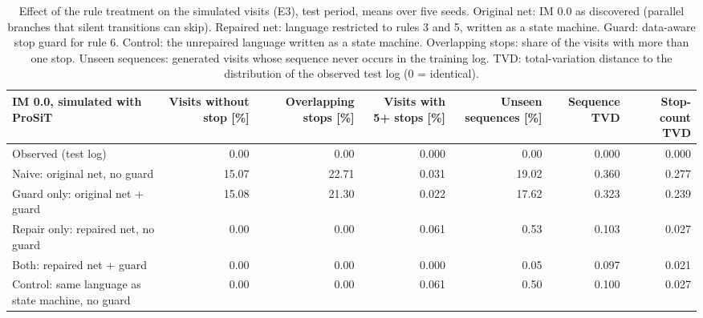 \begin{table}[htbp]
\centering
\footnotesize
\setlength{\tabcolsep}{3pt}
\begin{tabularx}{\textwidth}{Yrrrrrr}
\toprule
\textbf{IM 0.0, simulated with ProSiT} & \textbf{Visits without stop [\%]} & \textbf{Overlapping stops [\%]} & \textbf{Visits with 5+ stops [\%]} & \textbf{Unseen sequences [\%]} & \textbf{Sequence TVD} & \textbf{Stop-count TVD} \\
\midrule
Observed (test log) & 0.00 & 0.00 & 0.000 & 0.00 & 0.000 & 0.000 \\
\midrule
Naive: original net, no guard & 15.07 & 22.71 & 0.031 & 19.02 & 0.360 & 0.277 \\
Guard only: original net + guard & 15.08 & 21.30 & 0.022 & 17.62 & 0.323 & 0.239 \\
Repair only: repaired net, no guard & 0.00 & 0.00 & 0.061 & 0.53 & 0.103 & 0.027 \\
Both: repaired net + guard & 0.00 & 0.00 & 0.000 & 0.05 & 0.097 & 0.021 \\
\midrule
Control: same language as state machine, no guard & 0.00 & 0.00 & 0.061 & 0.50 & 0.100 & 0.027 \\
\bottomrule
\end{tabularx}
\caption{Effect of the rule treatment on the simulated visits (E3), test period, means over five seeds. Original net: IM 0.0 as discovered (parallel branches that silent transitions can skip). Repaired net: language restricted to rules 3 and 5, written as a state machine. Guard: data-aware stop guard for rule 6. Control: the unrepaired language written as a state machine. Overlapping stops: share of the visits with more than one stop. Unseen sequences: generated visits whose sequence never occurs in the training log. TVD: total-variation distance to the distribution of the observed test log (0 = identical).}
\label{tab:rq1_e3_2x2}
\end{table}
